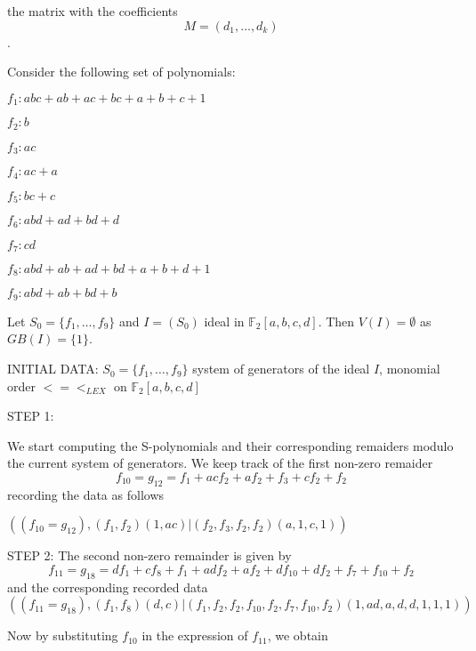 the matrix with the coefficients  $$M=(d_1,\ldots,d_k)$$.
	\begin{exemp}
Consider the following set of polynomials:
\begin{center}
$f_1: abc + ab + ac + bc + a + b + c + 1$
\end{center}
\begin{center}
$f_2: b$
\end{center}
\begin{center}
$f_3: ac$
\end{center}
\begin{center}
$f_4: ac + a$
\end{center}
\begin{center}
$f_5: bc + c$
\end{center}
\begin{center}
$f_6: abd + ad + bd + d$
\end{center}
\newpage
\begin{center}
$f_7: cd$
\end{center}
\begin{center}
$f_8: abd + ab + ad + bd + a + b + d + 1$
\end{center}
\begin{center}
$f_9: abd + ab +bd + b$
\end{center}
 
Let $S_0=\{f_1,\ldots,f_9\}$ and $I=(S_0)$ ideal in $\mathbb{F}_2[a,b,c,d]$. Then $V(I)=\emptyset$ as $GB(I)=\{1\}$.

INITIAL DATA: $S_0=\{f_1,\ldots,f_9\}$ system of generators of the ideal $I$, monomial order $<=<_{LEX}$ on $\mathbb{F}_2[a,b,c,d]$

STEP 1:
 
 We start computing the S-polynomials and their corresponding remaiders modulo the current system of generators.
 We keep track of the first non-zero remaider
$$f_{10}=g_{12}=f_1+acf_2+af_2+f_3+cf_2+f_2$$
recording the data as follows

\begin{center}
$((f_{10}=g_{12}), (f_1,f_2)(1,ac)|(f_2,f_3,f_2,f_2)(a,1,c,1))$
\end{center}
STEP 2:
 The second non-zero remainder is given by
$$f_{11}=g_{18}=df_1+cf_8+f_1+adf_2+af_2+df_{10}+df_2+f_7+f_{10}+f_{2}$$
and the corresponding recorded data 
$$((f_{11}=g_{18}), (f_1,f_8)(d,c)|(f_1,f_2,f_2,f_{10},f_2,f_7,f_{10},f_{2})(1,ad,a,d,d,1,1,1))$$

  Now by substituting $f_{10}$ in the expression of $f_{11}$, we obtain


\end{exemp}
